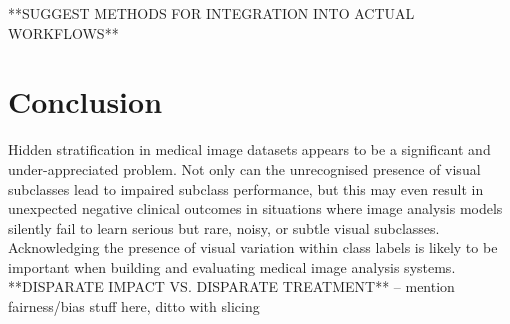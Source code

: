 \documentclass{article}
\begin{document}
 **SUGGEST METHODS FOR INTEGRATION INTO ACTUAL WORKFLOWS**


\section{Conclusion}

Hidden stratification in medical image datasets appears to be a significant and under-appreciated problem. Not only can the unrecognised presence of visual subclasses lead to impaired subclass performance, but this may even result in unexpected negative clinical outcomes in situations where image analysis models silently fail to learn serious but rare, noisy, or subtle visual subclasses.
Acknowledging the presence of visual variation within class labels is likely to be important when building and evaluating medical image analysis systems.
**DISPARATE IMPACT VS. DISPARATE TREATMENT** -- mention fairness/bias stuff here, ditto with slicing





\end{document}
